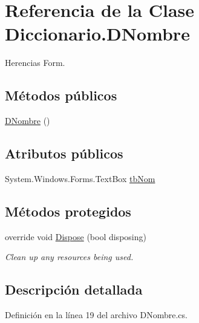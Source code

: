 \hypertarget{class_diccionario_1_1_d_nombre}{\section{Referencia de la Clase Diccionario.\-D\-Nombre}
\label{class_diccionario_1_1_d_nombre}
}


Herencias Form.

\subsection*{Métodos públicos}
\begin{DoxyCompactItemize}
\item 
\hyperlink{class_diccionario_1_1_d_nombre_ac5cfabfc4597f30d7c6e494a69bb8cb3}{D\-Nombre} ()
\end{DoxyCompactItemize}
\subsection*{Atributos públicos}
\begin{DoxyCompactItemize}
\item 
System.\-Windows.\-Forms.\-Text\-Box \hyperlink{class_diccionario_1_1_d_nombre_a7cbf78c3ddfbd2f70b62d515eafb5c82}{tb\-Nom}
\end{DoxyCompactItemize}
\subsection*{Métodos protegidos}
\begin{DoxyCompactItemize}
\item 
override void \hyperlink{class_diccionario_1_1_d_nombre_ab7aefb7df3a0e1e3525cb80c1d06b861}{Dispose} (bool disposing)
\begin{DoxyCompactList}\small\item\em Clean up any resources being used. \end{DoxyCompactList}\end{DoxyCompactItemize}


\subsection{Descripción detallada}


Definición en la línea 19 del archivo D\-Nombre.\-cs.



